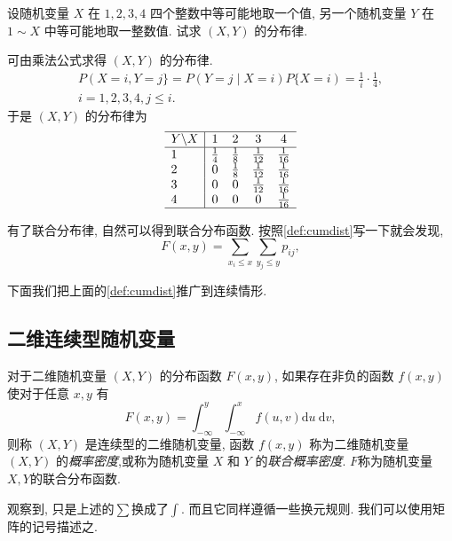     \begin{example}
      设随机变量 $X$ 在 $1,2,3,4$ 四个整数中等可能地取一个值, 另一个随机变量 $Y$ 在 $1 \sim X$ 中等可能地取一整数值. 试求 $(X, Y)$ 的分布律.
    \end{example}
    \begin{solution}
      {可由乘法公式求得 $(X, Y)$ 的分布律.}
        { $$
            \begin{gathered}
                P(X=i, Y=j\}=P(Y=j \mid X=i) P\{X=i)=\frac{1}{i} \cdot \frac{1}{4}, \\
                i=1,2,3,4, j \leq i .
            \end{gathered}
        $$}
        {于是 $(X, Y)$ 的分布律为}
        $$
            \begin{array}{l|cccc}
                \hline Y \backslash X   & 1           & 2           & 3            & 4            \\
                \hline 1 & \frac{1}{4} & \frac{1}{8} & \frac{1}{12} & \frac{1}{16} \\
                2        & 0           &\frac{1}{8}   &\frac{1}{12} &
                \frac{1}{16}\\
                3        & 0           & 0            &\frac{1}{12} & \frac{1}{16} \\
                4        & 0           & 0            & 0            & \frac{1}{16} \\
                \hline
            \end{array}
        $$
    \end{solution}
    有了联合分布律, 自然可以得到联合分布函数. 按照\cref{def:cumdist}写一下就会发现, 
    $$
        F(x, y)=\sum_{x_i \leq x} \sum_{y_j \leq y} p_{i j},
    $$
    
    下面我们把上面的\cref{def:cumdist}推广到连续情形.

    \subsection{二维连续型随机变量}
    \begin{definition}
      对于二维随机变量 $(X, Y)$ 的分布函数 $F(x, y)$, 如果存在非负的函数 $f(x, y)$ 使对于任意 $x, y$ 有
      $$
          F(x, y)=\int_{-\infty}^y \int_{-\infty}^x f(u, v) \mathrm{d} u \mathrm{~d} v,
      $$
      则称 $(X, Y)$ 是连续型的二维随机变量, 函数 $f(x, y)$ 称为二维随机变量 $(X, Y)$ 的\emph{概率密度},或称为随机变量 $X$ 和 $Y$ 的\emph{联合概率密度}. $F$称为随机变量$X, Y$的联合分布函数. 
  \end{definition}
  观察到, 只是上述的$\sum$换成了$\int$. 而且它同样遵循一些换元规则. 我们可以使用矩阵的记号描述之. 



